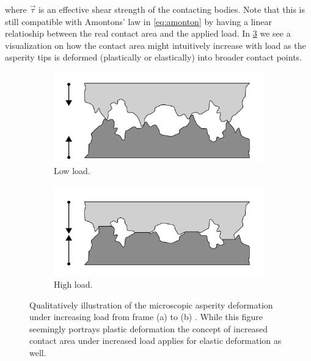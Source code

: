 where $\vec{\tau}$ is an effective shear strength of the contacting bodies. Note
that this is still compatible with Amontons’ law in \cref{eq:amonton} by having a linear relatioship between the real contact area and the
applied load. In \cref{fig:asperity_contact} we see a
visualization on how the contact area might intuitively increase with load as the asperity tips is deformed (plastically or elastically) into broader contact points.
\begin{figure}[H]
  \centering
  \begin{subfigure}[b]{0.49\textwidth}
      \centering
      \includegraphics[width=\textwidth]{figures/theory/asperities_top.png}
      \caption{Low load.}
      \label{fig:asp_left}
  \end{subfigure}
  \hfill
  \begin{subfigure}[b]{0.49\textwidth}
      \centering
      \includegraphics[width=\textwidth]{figures/theory/asperities_bottom.png}
      \caption{High load.}
      \label{fig:asp_right}
  \end{subfigure}
  \hfill
     \caption{Qualitatively illustration of the microscopic asperity deformation
     under increasing load from frame (a) to (b) \cite{wiki:asperities}. While this figure seemingly portrays plastic deformation the concept of increased contact area under increased load applies for elastic deformation as well.}
     \label{fig:asperity_contact}
\end{figure}

